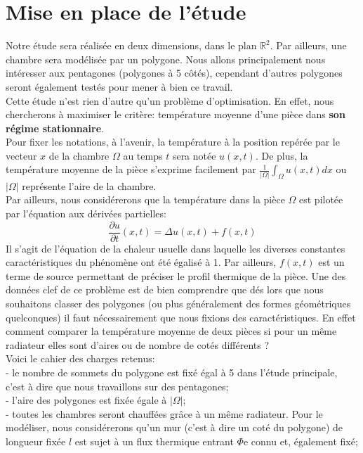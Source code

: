 \documentclass[a4paper,reqno]{article}
\begin{document}
\part{Mise en place de l'étude}
Notre étude sera réalisée en deux dimensions, dans le plan $\mathbb{R}^2$. Par ailleurs, une chambre sera modélisée par un polygone. Nous allons principalement nous intéresser aux pentagones (polygones à 5 côtés), cependant d'autres polygones seront également testés pour mener à bien ce travail. \\
Cette étude n'est rien d'autre qu'un problème d'optimisation. En effet, nous chercherons à maximiser le critère: température moyenne d'une pièce dans \textbf{son régime stationnaire}. \\ Pour fixer les notations, à l'avenir, la température à la position repérée par le vecteur $x$ de la chambre $\Omega$ au temps $t$ sera notée $u(x,t)$. De plus, la température moyenne de la pièce s'exprime facilement par  $ \frac {1}{|\Omega|}\int_{\Omega} u(x,t) dx $ ou $|\Omega|$ représente l'aire de la chambre.\\
Par ailleurs, nous considérerons que la température dans la pièce $\Omega$ est pilotée par l'équation aux dérivées partielles: 
\\
\begin{equation}
\frac{\partial u}{\partial t}(x,t) = \Delta u(x,t) + f(x,t)
\end{equation}
Il s'agit de l'équation de la chaleur usuelle dans laquelle les diverses constantes caractéristiques du phénomène ont été égalisé à 1. Par ailleurs, $f(x,t)$ est un terme de source permettant de préciser le profil thermique de la pièce.
Une des données clef de ce problème est de bien comprendre que dés lors que nous souhaitons classer des polygones (ou plus généralement des formes géométriques quelconques) il faut nécessairement que nous fixions des caractéristiques. En effet comment comparer la température moyenne de deux pièces si pour un même radiateur elles sont d'aires ou de nombre de cotés différents ? \\
Voici le cahier des charges retenus: \\
- le nombre de sommets du polygone est fixé égal à 5 dans l'étude principale, c'est à dire que nous travaillons sur des pentagones; \\
- l'aire des polygones est fixée égale à $|\Omega|$; \\
- toutes les chambres seront chauffées grâce à un même radiateur. Pour le modéliser, nous considérerons qu'un mur (c'est à dire un coté du polygone) de longueur fixée $l$ est sujet à un flux thermique entrant $\Phi$e connu et, également fixé;  \\
\end{document}
